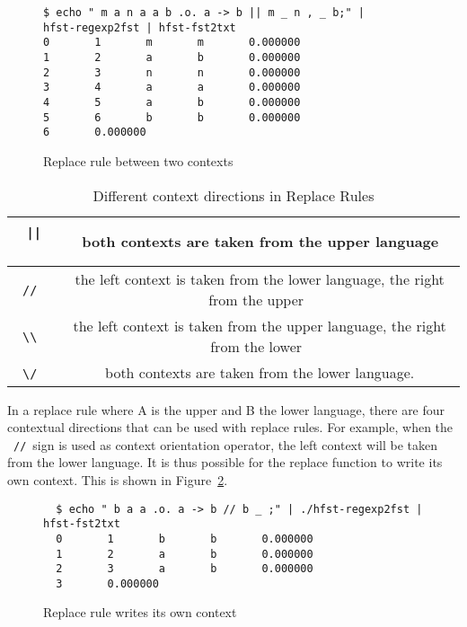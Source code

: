 \documentclass{llncs}
\begin{document}
\begin{figure} [h!]
\begin{verbatim}
$ echo " m a n a a b .o. a -> b || m _ n , _ b;" |
hfst-regexp2fst | hfst-fst2txt
0       1       m       m       0.000000
1       2       a       b       0.000000
2       3       n       n       0.000000
3       4       a       a       0.000000
4       5       a       b       0.000000
5       6       b       b       0.000000
6       0.000000
\end{verbatim}
\caption{Replace rule between two contexts}
\label{fig:multiple_contexts}
\end{figure}

\begin{table} [h!]
  \centering
  \caption{Different context directions in Replace Rules}
  \begin{tabular}{ | c | c | }
    \hline
    \ \verb!||!\ & \ both contexts are taken from the upper language \\ \hline
    \ \verb!//!\ & \ the left context is taken from the lower language, the right from the upper \\ \hline
    \ \verb!\\!\ & \ the left context is taken from the upper language, the right from the lower \\ \hline
    \ \verb!\/!\ & \ both contexts are taken from the lower language. \\ \hline
  \end{tabular}
  \label{tab:context_directions}
\end{table}

In a replace rule where A is the upper and B the lower language, 
there are four contextual directions that can be used with replace rules.
For example, when the \ \verb!//!\ sign is used as context orientation operator, 
the left context will be taken from the lower language. 
It is thus possible for the replace function to write its own context. 
This is shown in Figure~\ref{fig:context_orientation}. 

\begin{figure} [h!]
\begin{verbatim}
  $ echo " b a a .o. a -> b // b _ ;" | ./hfst-regexp2fst | hfst-fst2txt
  0       1       b       b       0.000000
  1       2       a       b       0.000000
  2       3       a       b       0.000000
  3       0.000000
\end{verbatim}
\caption{Replace rule writes its own context}
\label{fig:context_orientation}
\end{figure}
\end{document}
